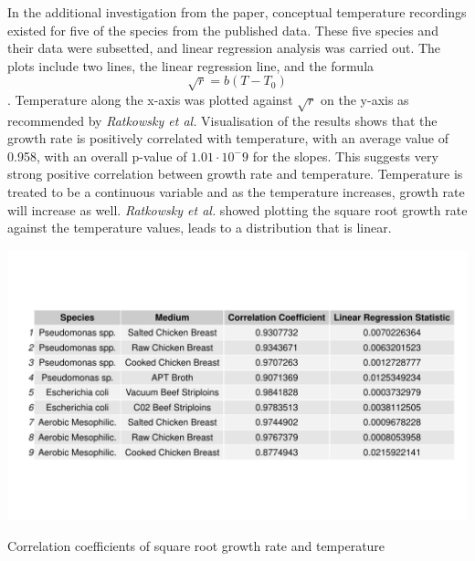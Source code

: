 In the additional investigation from the paper, conceptual temperature recordings existed for five of the species from the published data. These five species and their data were subsetted, and linear regression analysis was carried out. The plots include two lines, the linear regression line, and the formula \begin{equation*}\sqrt{r}=b(T-T_0)\end{equation*}\cite{ratkowsky1982relationship}. Temperature along the x-axis was plotted against $\sqrt{r}$ on the y-axis as recommended by \textit{Ratkowsky et al.} Visualisation of the results shows that the growth rate is positively correlated with temperature, with an average value of 0.958, with an overall p-value of $1.01\cdot10^-9$ for the slopes. This suggests very strong positive correlation between growth rate and temperature. Temperature is treated to be a continuous variable and as the temperature increases, growth rate will increase as well. \textit{Ratkowsky et al.} showed plotting the square root growth rate against the temperature values, leads to a distribution that is linear.
\begin{table}[h!]
\centering
\includegraphics[scale=0.40]{../Results/Temperature_Growthrate.pdf} \caption{Correlation coefficients of square root growth rate and temperature} \label{tab:Correlation Table}
\end{table}
